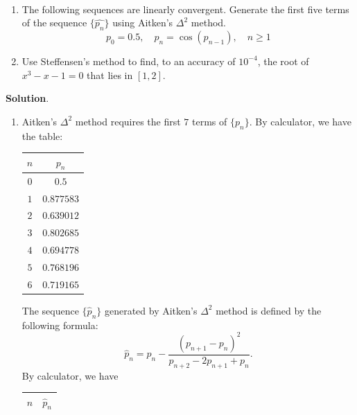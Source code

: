 \documentclass[11pt]{article}
\theoremstyle{break}
\numberwithin{equation}{theorem}
\begin{document}
\newpage
\begin{problem}\label{problem 10}$\ $
    \begin{enumerate}
        \item The following sequences are linearly convergent. Generate the first five terms of the sequence $\{\hat{p_n}\}$ using Aitken's $\Delta^2$ method.
        \begin{equation*}
            p_0=0.5, \quad p_n=\cos(p_{n-1}), \quad n\geq 1
        \end{equation*}
        \item Use Steffensen's method to find, to an accuracy of $10^{-4}$, the root of $x^3-x-1=0$ that lies in $[1, 2]$.
    \end{enumerate}
\end{problem}
\textbf{Solution}.
\begin{enumerate}
    \item Aitken's $\Delta^2$ method requires the first $7$ terms of $\{p_n\}$. By calculator, we have the table:
    \begin{center}
        \begin{tabular}{|c|c|}
            \hline
            $n$ & $p_n$ \\
            \hline
            $0$ & $0.5$ \\
            \hline
            $1$ & $0.877583$ \\
            \hline
            $2$ & $0.639012$ \\
            \hline
            $3$ & $0.802685$ \\
            \hline
            $4$ & $0.694778$ \\
            \hline
            $5$ & $0.768196$ \\
            \hline
            $6$ & $0.719165$ \\
            \hline
        \end{tabular}
    \end{center}
    The sequence $\{\hat{p}_n\}$ generated by Aitken's $\Delta^2$ method is defined by the following formula:
    \begin{equation*}
        \hat{p}_n=p_n-\dfrac{(p_{n+1}-p_n)^2}{p_{n+2}-2p_{n+1}+p_n}.
    \end{equation*}
    By calculator, we have
    \begin{center}
        \begin{tabular}{|c|c|}
            \hline
            $n$ & $\hat{p}_n$ \\
            \hline

\end{tabular}
\end{center}
\end{enumerate}
\end{document}
